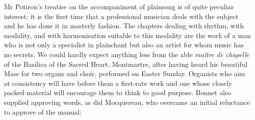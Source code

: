   {\cite[p.~ix]{PotironCoursaccompagnementchant1925}}
{Mr Potiron's treatise on the accompaniment of plainsong is of quite peculiar interest; it is the first time that a professional musician deals with the subject and he has done it in masterly fashion. The chapters dealing with rhythm, with modality, and with harmonisation suitable to this modality are the work of a man who is not only a specialist in plainchant but also an artist for whom music has no secrets.
We could hardly expect anything less from the able \emph{maître de chapelle} of the Basilica of the Sacred Heart, Montmartre, after having heard his beautiful Mass for two organs and choir, performed on Easter Sunday. Organists who aim at consistency will have before them a first-rate work and one whose closely packed material will encourage them to think to good purpose.}
  {\cite[Adapted from][p.~vii]{PotironTreatiseAccompanimentGregorian1933}}
\noindent
Bonnet also supplied approving words, as did Mocquereau, who overcame an initial \mbox{reluctance} to approve of the manual:
\pagebreak{}
%

